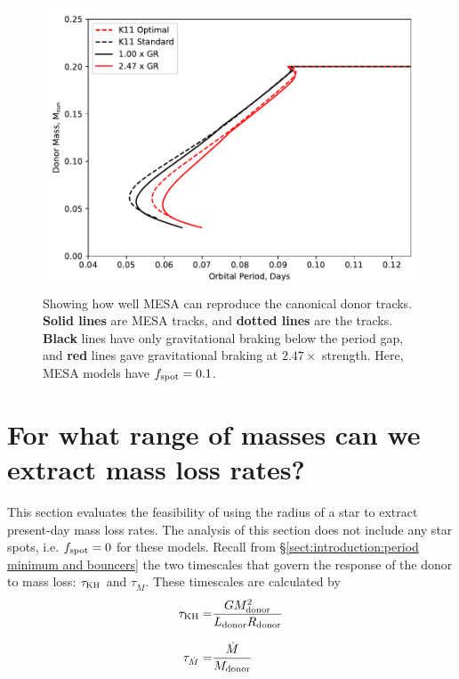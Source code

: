 \begin{figure}
    \centering
    \includegraphics[width=.9\textwidth]{figures/modelling/reproducing_K11_tracks_fspot0.100.pdf}
    \caption{Showing how well MESA can reproduce the canonical \citet{knigge11} donor tracks. {\bf Solid lines} are MESA tracks, and {\bf dotted lines} are the \citet{knigge11} tracks. {\bf Black} lines have only gravitational braking below the period gap, and {\bf red} lines gave gravitational braking at $2.47\times$ strength. Here, MESA models have $f_{\rm spot} = 0.1$.}
    \label{fig:results:MESA can reproduce the K11 tracks}
\end{figure}



\section{For what range of masses can we extract mass loss rates?}
\label{sect:results:MESA massloss allowable mass range}

This section evaluates the feasibility of using the radius of a star to extract present-day mass loss rates.
The analysis of this section does not include any star spots, i.e. $f_{\rm spot} = 0$ for these models.
Recall from \S\ref{sect:introduction:period minimum and bouncers} the two timescales that govern the response of the donor to mass loss: $\tau_{\rm KH}$ and $\tau_{\dot M}$. These timescales are calculated by
\begin{align}
    \tau_{\rm KH} =& \frac{G M_{\rm donor}^2}{L_{\rm donor} R_{\rm donor}} \\[8pt]
    \tau_{\dot M} =& \frac{\dot M}{M_{\rm donor}}
\end{align}


